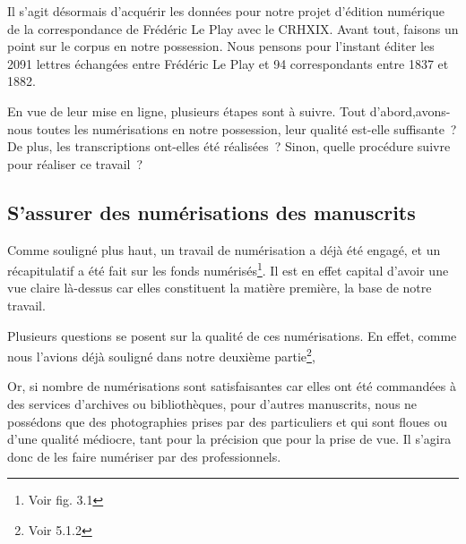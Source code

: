 Il s'agit désormais d'acquérir les données pour notre projet d'édition numérique de la correspondance de Frédéric Le Play avec le CRHXIX. Avant tout, faisons un point sur le corpus en notre possession. Nous pensons pour l'instant éditer les  2091 lettres échangées entre Frédéric Le Play et 94 correspondants entre 1837 et 1882. 

En vue de leur mise en ligne, plusieurs étapes sont à suivre. Tout d’abord,avons-nous toutes les numérisations en notre possession, leur qualité est-elle suffisante ? De plus, les transcriptions ont-elles été réalisées ? Sinon, quelle procédure suivre pour réaliser ce travail ?

\subsection{S'assurer des numérisations des manuscrits}

Comme souligné plus haut, un travail de numérisation a déjà été engagé, et un récapitulatif a été fait sur les fonds numérisés\footnote{Voir fig. 3.1}. Il est en effet capital d'avoir une vue claire là-dessus car elles constituent la matière première, la base de notre travail. 

Plusieurs questions se posent sur la qualité de ces numérisations. En effet, comme nous l'avions déjà souligné dans notre deuxième partie\footnote{Voir 5.1.2},
\begin{quote}
\end{quote}
Or, si nombre de numérisations sont satisfaisantes car elles ont été commandées à des services d'archives ou bibliothèques, pour d'autres manuscrits, nous ne possédons que des photographies prises par des particuliers et qui sont floues ou d'une qualité médiocre, tant pour la précision que pour la prise de vue. Il s'agira donc de les faire numériser par des professionnels.

